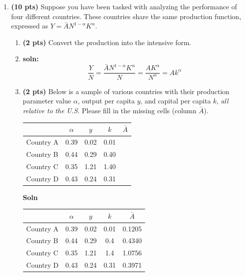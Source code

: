 \documentclass[14pt, oneside]{memoir}
\begin{document}
\begin{enumerate}[label=\textbf{\arabic*.}, itemsep=15pt]

\clearpage
\item  \textbf{(10 pts)}\label{P4} Suppose you have been tasked with analyzing the performance of four different countries. These countries share the same production function, expressed as $Y= \bar{A} N^{1-\alpha} K^{\alpha}$.

\begin{enumerate}[label=(\alph*)]
	
	
	\item \textbf{(2 pts)} Convert the production into the intensive form.
	\vspace{1cm}
	\item[] \textbf{soln:} \[\frac{Y}{N}= \frac{\bar{A} N^{1-\alpha} K^{\alpha}}{N} = \frac{AK^{\alpha}}{N^\alpha} = Ak^\alpha\]
	
	\vspace{1cm}
	\item \textbf{(2 pts)} Below is a sample of various countries with their production parameter value $\alpha$, output per capita $y$, and capital per capita $k$, \textit{all relative to the U.S}. Please fill in the missing cells (column $\bar{A}$).
	
	\begin{table}[htbp]
		\centering
		\begin{tabular}{p{7.135em}cccc}
			\multicolumn{1}{l}{} & $\alpha$ & $y$ & $k$ & $\bar{A}$ \\
			\midrule
			Country A & 0.39  & 0.02  & 0.01  &  \\
			Country B & 0.44  & 0.29  & 0.40  &  \\
			Country C & 0.35  & 1.21  & 1.40  &  \\
			Country D & 0.43  & 0.24  & 0.31  &  \\
			\bottomrule
		\end{tabular}%
	\end{table}%
	\textbf{Soln}
		\begin{table}[htbp]
				\centering
				\begin{tabular}{p{7.135em}cccc}
						\multicolumn{1}{l}{} & $\alpha$ & $y$ & $k$ & $\bar{A}$ \\ \hline
						Country A & 0.39  & 0.02  & 0.01  & 0.1205 \\
						Country B & 0.44  & 0.29  & 0.4   & 0.4340 \\
						Country C & 0.35  & 1.21  & 1.4   & 1.0756 \\
						Country D & 0.43  & 0.24  & 0.31  & 0.3971 \\
						\bottomrule
					\end{tabular}%
				\label{tab:addlabel}%
			\end{table}%
	

\end{enumerate}
\end{enumerate}
\end{document}
